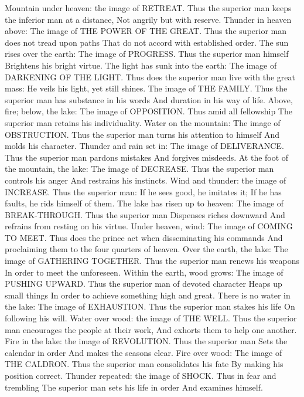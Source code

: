 {\or
Mountain under heaven: the image of
RETREAT.
Thus the superior man keeps the inferior man at a distance,
Not angrily but with reserve.
\or
Thunder in heaven above:
The image of THE POWER OF THE
GREAT.
\or
Thus the superior man does not tread upon paths
That do not accord with established order.
\or
The sun rises over the earth:
The image of PROGRESS.
Thus the superior man himself
Brightens his bright virtue.
\or
The light has sunk into the earth:
The image of DARKENING OF THE LIGHT.
Thus does the superior man live with the great mass:
He veils his light, yet still shines.
\or
The image of THE FAMILY.
Thus the superior man has substance in his words
And duration in his way of life.
\or
Above, fire; below, the lake:
The image of OPPOSITION.
Thus amid all fellowship
The superior man retains his individuality.
\or
Water on the mountain:
The image of OBSTRUCTION.
Thus the superior man turns his attention to himself
And molds his character.
\or
Thunder and rain set in:
The image of DELIVERANCE.
Thus the superior man pardons mistakes
And forgives misdeeds.
\or
At the foot of the mountain, the lake:
The image of DECREASE.
Thus the superior man controls his anger
And restrains his instincts.
\or
Wind and thunder: the image of
INCREASE.
Thus the superior man:
If he sees good, he imitates it;
If he has faults, he rids himself of them.
\or
The lake has risen up to heaven:
The image of BREAK-THROUGH.
Thus the superior man
Dispenses riches downward
And refrains from resting on his virtue.
\or
Under heaven, wind:
The image of COMING TO MEET.
Thus does the prince act when disseminating his commands
And proclaiming them to the four quarters of heaven.
\or
Over the earth, the lake:
The image of GATHERING TOGETHER.
Thus the superior man renews his weapons
In order to meet the unforeseen.
\or
Within the earth, wood grows:
The image of PUSHING UPWARD.
Thus the superior man of devoted character
Heaps up small things
In order to achieve something high and great.
\or
There is no water in the lake:
The image of EXHAUSTION.
Thus the superior man stakes his life
On following his will.
\or
Water over wood: the image of THE WELL.
Thus the superior man encourages the people at their work,
And exhorts them to help one another.
\or
Fire in the lake: the image of
REVOLUTION.
Thus the superior man
Sets the calendar in order
And makes the seasons clear.
\or
Fire over wood:
The image of THE CALDRON.
Thus the superior man consolidates his fate
By making his position correct.
\or
Thunder repeated: the image of SHOCK.
Thus in fear and trembling
The superior man sets his life in order
And examines himself.
}
